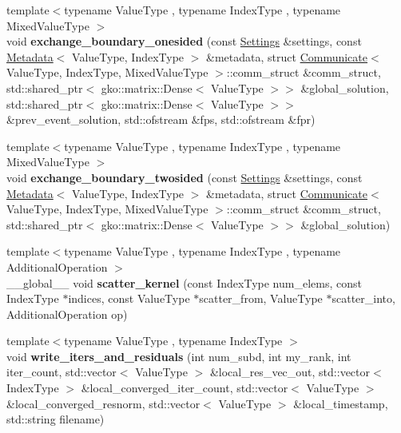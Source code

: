 \begin{DoxyCompactItemize}
\item 
\mbox{\label{namespaceschwz_adf77ac4787206cc2656b31a2c934cf9e}} 
{\footnotesize template$<$typename Value\+Type , typename Index\+Type , typename Mixed\+Value\+Type $>$ }\\void {\bfseries exchange\+\_\+boundary\+\_\+onesided} (const \hyperlink{structschwz_1_1Settings}{Settings} \&settings, const \hyperlink{structschwz_1_1Metadata}{Metadata}$<$ Value\+Type, Index\+Type $>$ \&metadata, struct \hyperlink{classschwz_1_1Communicate}{Communicate}$<$ Value\+Type, Index\+Type, Mixed\+Value\+Type $>$\+::comm\+\_\+struct \&comm\+\_\+struct, std\+::shared\+\_\+ptr$<$ gko\+::matrix\+::\+Dense$<$ Value\+Type $>$$>$ \&global\+\_\+solution, std\+::shared\+\_\+ptr$<$ gko\+::matrix\+::\+Dense$<$ Value\+Type $>$$>$ \&prev\+\_\+event\+\_\+solution, std\+::ofstream \&fps, std\+::ofstream \&fpr)
\item 
\mbox{\label{namespaceschwz_a5c58f9da7e21d6671295b7b62f45b33f}} 
{\footnotesize template$<$typename Value\+Type , typename Index\+Type , typename Mixed\+Value\+Type $>$ }\\void {\bfseries exchange\+\_\+boundary\+\_\+twosided} (const \hyperlink{structschwz_1_1Settings}{Settings} \&settings, const \hyperlink{structschwz_1_1Metadata}{Metadata}$<$ Value\+Type, Index\+Type $>$ \&metadata, struct \hyperlink{classschwz_1_1Communicate}{Communicate}$<$ Value\+Type, Index\+Type, Mixed\+Value\+Type $>$\+::comm\+\_\+struct \&comm\+\_\+struct, std\+::shared\+\_\+ptr$<$ gko\+::matrix\+::\+Dense$<$ Value\+Type $>$$>$ \&global\+\_\+solution)
\item 
\mbox{\label{namespaceschwz_a1149b1cad510b1ae7285480c970fd2b3}} 
{\footnotesize template$<$typename Value\+Type , typename Index\+Type , typename Additional\+Operation $>$ }\\\+\_\+\+\_\+global\+\_\+\+\_\+ void {\bfseries scatter\+\_\+kernel} (const Index\+Type num\+\_\+elems, const Index\+Type $\ast$indices, const Value\+Type $\ast$scatter\+\_\+from, Value\+Type $\ast$scatter\+\_\+into, Additional\+Operation op)
\item 
\mbox{\label{namespaceschwz_af5437b273e3d364a2b3fa80929aeded9}} 
{\footnotesize template$<$typename Value\+Type , typename Index\+Type $>$ }\\void {\bfseries write\+\_\+iters\+\_\+and\+\_\+residuals} (int num\+\_\+subd, int my\+\_\+rank, int iter\+\_\+count, std\+::vector$<$ Value\+Type $>$ \&local\+\_\+res\+\_\+vec\+\_\+out, std\+::vector$<$ Index\+Type $>$ \&local\+\_\+converged\+\_\+iter\+\_\+count, std\+::vector$<$ Value\+Type $>$ \&local\+\_\+converged\+\_\+resnorm, std\+::vector$<$ Value\+Type $>$ \&local\+\_\+timestamp, std\+::string filename)
$$
\end{DoxyCompactItemize}
